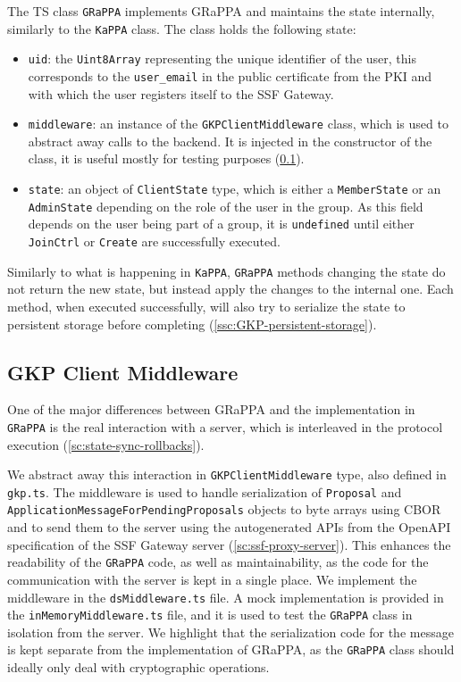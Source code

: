 The TS class \texttt{GRaPPA} implements GRaPPA and maintains the state internally, similarly to the \texttt{KaPPA} class.
The class holds the following state:
\begin{itemize}
    \item \texttt{uid}: the \texttt{Uint8Array} representing the unique identifier of the user, this corresponds to the \texttt{user\_email} in the public certificate from the PKI and with which the user registers itself to the SSF Gateway.
    \item \texttt{middleware}: an instance of the \texttt{GKPClientMiddleware} class, which is used to abstract away calls to the backend. It is injected in the constructor of the class, it is useful mostly for testing purposes (\cref{ssc:GKP-client-middleware}).
    \item \texttt{state}: an object of \texttt{ClientState} type, which is either a \texttt{MemberState} or an \texttt{AdminState} depending on the role of the user in the group. As this field depends on the user being part of a group, it is \texttt{undefined} until either \texttt{JoinCtrl} or \texttt{Create} are successfully executed. 
\end{itemize}

Similarly to what is happening in \texttt{KaPPA}, \texttt{GRaPPA} methods changing the state
do not return the new state, but instead apply the changes to the internal one.
Each method, when executed successfully, will also try to serialize the state to persistent storage before completing (\cref{ssc:GKP-persistent-storage}).


\subsection{GKP Client Middleware}\label{ssc:GKP-client-middleware}
One of the major differences between GRaPPA and the implementation in \texttt{GRaPPA}
is the real interaction with a server, which is interleaved in the protocol execution (\cref{sc:state-sync-rollbacks}).

We abstract away this interaction in \texttt{GKPClientMiddleware} type, also
defined in \texttt{gkp.ts}. The middleware is used to handle serialization of
\texttt{Proposal} and \texttt{ApplicationMessageForPendingProposals} objects
to byte arrays using CBOR and to send them to the server using the autogenerated
APIs from the OpenAPI specification of the SSF Gateway server (\cref{sc:ssf-proxy-server}).
This enhances the readability of the \texttt{GRaPPA} code, as well as maintainability,
as the code for the communication with the server is kept in a single place.
We implement the middleware in the \texttt{dsMiddleware.ts} file.
A mock implementation is provided in the \texttt{inMemoryMiddleware.ts} file, 
and it is used to test the \texttt{GRaPPA} class in isolation from the server.
We highlight that the serialization code for the message is kept separate
from the implementation of GRaPPA, as the \texttt{GRaPPA} class should ideally only
deal with cryptographic operations.

